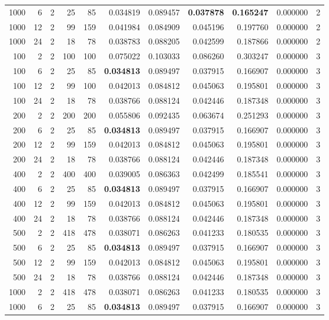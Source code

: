 \begin{table}
\begin{tabular}{rrrrrrrrrrr}
1000 & 6 & 2 & 25 & 85 & 0.034819 & 0.089457 & \textbf{0.037878} & \textbf{0.165247} & 0.000000 & 2 \\
1000 & 12 & 2 & 99 & 159 & 0.041984 & 0.084909 & 0.045196 & 0.197760 & 0.000000 & 2 \\
1000 & 24 & 2 & 18 & 78 & 0.038783 & 0.088205 & 0.042599 & 0.187866 & 0.000000 & 2 \\
100 & 2 & 2 & 100 & 100 & 0.075022 & 0.103033 & 0.086260 & 0.303247 & 0.000000 & 3 \\
100 & 6 & 2 & 25 & 85 & \textbf{0.034813} & 0.089497 & 0.037915 & 0.166907 & 0.000000 & 3 \\
100 & 12 & 2 & 99 & 100 & 0.042013 & 0.084812 & 0.045063 & 0.195801 & 0.000000 & 3 \\
100 & 24 & 2 & 18 & 78 & 0.038766 & 0.088124 & 0.042446 & 0.187348 & 0.000000 & 3 \\
200 & 2 & 2 & 200 & 200 & 0.055806 & 0.092435 & 0.063674 & 0.251293 & 0.000000 & 3 \\
200 & 6 & 2 & 25 & 85 & \textbf{0.034813} & 0.089497 & 0.037915 & 0.166907 & 0.000000 & 3 \\
200 & 12 & 2 & 99 & 159 & 0.042013 & 0.084812 & 0.045063 & 0.195801 & 0.000000 & 3 \\
200 & 24 & 2 & 18 & 78 & 0.038766 & 0.088124 & 0.042446 & 0.187348 & 0.000000 & 3 \\
400 & 2 & 2 & 400 & 400 & 0.039005 & 0.086363 & 0.042499 & 0.185541 & 0.000000 & 3 \\
400 & 6 & 2 & 25 & 85 & \textbf{0.034813} & 0.089497 & 0.037915 & 0.166907 & 0.000000 & 3 \\
400 & 12 & 2 & 99 & 159 & 0.042013 & 0.084812 & 0.045063 & 0.195801 & 0.000000 & 3 \\
400 & 24 & 2 & 18 & 78 & 0.038766 & 0.088124 & 0.042446 & 0.187348 & 0.000000 & 3 \\
500 & 2 & 2 & 418 & 478 & 0.038071 & 0.086263 & 0.041233 & 0.180535 & 0.000000 & 3 \\
500 & 6 & 2 & 25 & 85 & \textbf{0.034813} & 0.089497 & 0.037915 & 0.166907 & 0.000000 & 3 \\
500 & 12 & 2 & 99 & 159 & 0.042013 & 0.084812 & 0.045063 & 0.195801 & 0.000000 & 3 \\
500 & 24 & 2 & 18 & 78 & 0.038766 & 0.088124 & 0.042446 & 0.187348 & 0.000000 & 3 \\
1000 & 2 & 2 & 418 & 478 & 0.038071 & 0.086263 & 0.041233 & 0.180535 & 0.000000 & 3 \\
1000 & 6 & 2 & 25 & 85 & \textbf{0.034813} & 0.089497 & 0.037915 & 0.166907 & 0.000000 & 3 \\

\end{tabular}
\end{table}
